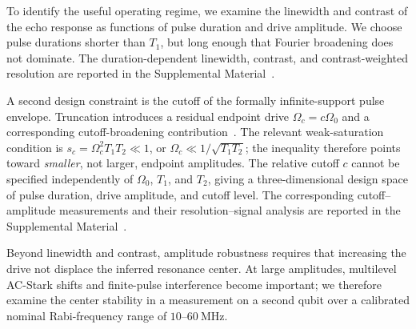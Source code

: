 


To identify the useful operating regime, we examine the linewidth and contrast
of the echo response as functions of pulse duration and drive amplitude.  We
choose pulse durations shorter than $T_1$, but long enough that Fourier
broadening does not dominate.  The duration-dependent linewidth, contrast,
and contrast-weighted resolution are reported in the Supplemental
Material~\cite{SupplementalMaterial}.

A second design constraint is the cutoff of the formally infinite-support
pulse envelope.  Truncation introduces a residual endpoint drive
$\Omega_c=c\Omega_0$ and a corresponding cutoff-broadening
contribution~\cite{boradjiev_qubit_2013,mihov_defying_2024,mihov_qubit_2024}.
The relevant weak-saturation condition is
$s_c=\Omega_c^2T_1T_2\ll1$, or
$\Omega_c\ll1/\sqrt{T_1T_2}$; the inequality therefore points toward
\emph{smaller}, not larger, endpoint amplitudes.  The relative cutoff $c$
cannot be specified independently of $\Omega_0$, $T_1$, and $T_2$, giving a
three-dimensional design space of pulse duration, drive amplitude, and cutoff
level.  The corresponding cutoff--amplitude measurements and their
resolution--signal analysis are reported in the Supplemental
Material~\cite{SupplementalMaterial}.

Beyond linewidth and contrast, amplitude robustness requires that increasing
the drive not displace the inferred resonance center.  At large amplitudes,
multilevel AC-Stark shifts and finite-pulse interference become important; we
therefore examine the center stability in a measurement on a second qubit
over a calibrated nominal Rabi-frequency range of $10$--$60~\mathrm{MHz}$.


